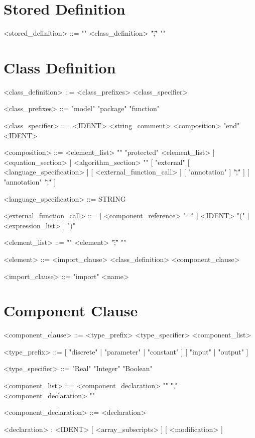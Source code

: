 \documentclass[11pt,a4paper,notitlepage]{report}
\begin{document}
\section{Stored Definition}

\begin{grammar}\scriptsize
<stored_definition> ::= 
"{" <class_definition> "\";\"" "}"
\end{grammar}


\section{Class Definition}

\begin{grammar}\scriptsize
<class_definition> ::=
<class_prefixes> <class_specifier>

<class_prefixes> ::=
"model"
\alt "package" 
 "function"

<class_specifier> ::=
<IDENT> <string_comment> <composition> "end" <IDENT>

<composition> ::=
<element_list> "{" "protected" <element_list> | <equation_section> | <algorithm_section> "}"
[ "external" [ <language_specification> ] [ <external_function_call> ] [ "annotation" ] "\";\"" ]
[ "annotation" "\";\"" ]

<language_specification> ::=
STRING

<external_function_call> ::=
[ <component_reference> "\"=\"" ] <IDENT> "(" [ <expression_list> ] ")"

<element_list> ::=
"{" <element> "\";\"" "}"

<element> ::=
<import_clause> 
\alt <class_definition> 
\alt <component_clause>

<import_clause> ::=
"import" <name> 

\end{grammar}

\section{Component Clause}

\begin{grammar}\scriptsize

<component_clause> ::=
<type_prefix> <type_specifier> <component_list>

<type_prefix> ::=
[ "discrete" | "parameter" | "constant" ] [ "input" | "output" ]

<type_specifier> ::=
"Real"
\alt "Integer"
\alt "Boolean"

<component_list> ::=
<component_declaration> "{" "\",\"" <component_declaration> "}"

<component_declaration> ::=
<declaration> 

<declaration> :
<IDENT> [ <array_subscripts> ] [ <modification> ]

\end{grammar}
\end{document}
